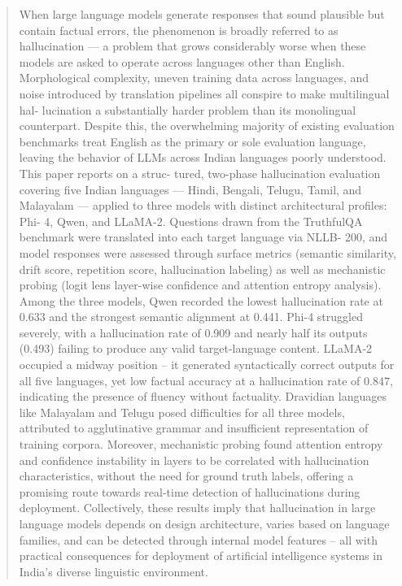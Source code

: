 \documentclass[conference]{IEEEtran}
\begin{document}
\begin{abstract}
When large language models generate responses that
sound plausible but contain factual errors, the phenomenon is
broadly referred to as hallucination — a problem that grows
considerably worse when these models are asked to operate
across languages other than English. Morphological complexity,
uneven training data across languages, and noise introduced
by translation pipelines all conspire to make multilingual hal-
lucination a substantially harder problem than its monolingual
counterpart. Despite this, the overwhelming majority of existing
evaluation benchmarks treat English as the primary or sole
evaluation language, leaving the behavior of LLMs across Indian
languages poorly understood. This paper reports on a struc-
tured, two-phase hallucination evaluation covering five Indian
languages — Hindi, Bengali, Telugu, Tamil, and Malayalam —
applied to three models with distinct architectural profiles: Phi-
4, Qwen, and LLaMA-2. Questions drawn from the TruthfulQA
benchmark were translated into each target language via NLLB-
200, and model responses were assessed through surface metrics
(semantic similarity, drift score, repetition score, hallucination
labeling) as well as mechanistic probing (logit lens layer-wise
confidence and attention entropy analysis). Among the three
models, Qwen recorded the lowest hallucination rate at 0.633
and the strongest semantic alignment at 0.441. Phi-4 struggled
severely, with a hallucination rate of 0.909 and nearly half
its outputs (0.493) failing to produce any valid target-language
content. LLaMA-2 occupied a midway position – it generated
syntactically correct outputs for all five languages, yet low factual
accuracy at a hallucination rate of 0.847, indicating the presence
of fluency without factuality. Dravidian languages like Malayalam
and Telugu posed difficulties for all three models, attributed to
agglutinative grammar and insufficient representation of training
corpora. Moreover, mechanistic probing found attention entropy
and confidence instability in layers to be correlated with
hallucination characteristics, without the need for ground truth
labels, offering a promising route towards real-time detection of
hallucinations during deployment. Collectively, these results imply
that hallucination in large language models depends on design
architecture, varies based on language families, and can be detected
through internal model features – all with practical consequences
for deployment of artificial intelligence systems in India’s diverse
linguistic environment.
\end{abstract}
\end{document}
